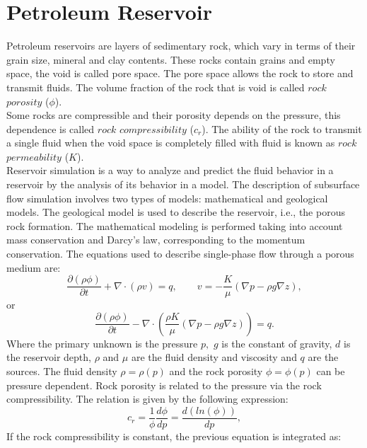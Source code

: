 \documentclass[12pt]{report}
\begin{document}
\section{Petroleum Reservoir}
\hspace{0.5cm}
Petroleum reservoirs are layers of sedimentary rock, which vary in terms of their grain size, mineral
and clay contents. 
These rocks contain grains and empty space, the void is called pore space.
The pore space allows the rock to 
store and transmit fluids. The volume fraction of the rock that is void is called $rock$
$porosity$ ($\phi$).\\
Some rocks are compressible and their porosity depends on the pressure, this dependence is called 
$rock$ $compressibility$ ($c_r$). 
The ability of the rock to transmit a single fluid when the void space is completely filled with fluid
is known as $rock$ $permeability$ (${K}$). \\
Reservoir simulation is a way to analyze and predict the fluid behavior in a reservoir
by the analysis of its behavior in a model. The description of subsurface flow simulation involves two types of models: 
mathematical and geological models. The geological model is used to describe the reservoir, i.e., the porous rock formation. 
The mathematical modeling is performed taking into account mass conservation and Darcy's law,
corresponding to the momentum conservation. The equations used to describe single-phase flow through a porous medium are:
\begin{equation}\label{eq:ce}
\frac{\partial (\rho \phi)}{\partial t}+ \nabla \cdot ( \rho {v})=q, \qquad v=-\frac{K}{\mu}(\nabla p-\rho g\nabla z),
\end{equation}
or
\begin{equation}\label{eq:ce1}
\frac{\partial (\rho \phi)}{\partial t}- \nabla \cdot \left( \frac{\rho{K}}{\mu}(\nabla {p}-\rho g\nabla z)\right)=q.
\end{equation}
Where the primary unknown is the pressure ${p},$ $g$ is the constant of gravity, $d$ is the reservoir depth,
$\rho$ and $\mu$ are the fluid density and viscosity and $q$ are the sources. The fluid density $\rho=\rho(p)$ and the rock porosity $\phi=\phi(p)$ can be pressure dependent.
Rock porosity is related to the pressure via the rock compressibility. The relation is given by the following expression:
\begin{equation*}
 c_r=\frac{1}{\phi}\frac{d\phi}{dp}=\frac{d(ln(\phi))}{dp},
\end{equation*}
If the rock compressibility is constant, the previous equation is integrated as:
\end{document}
